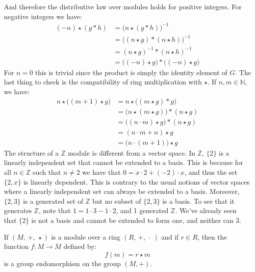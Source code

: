     And therefore the distributive law over modules holds for positive integers.
    For negative integers we have:
    \begin{subequations}
        \begin{align}
            (\minus{n})\star(g*h)
            &=\big(n\star(g*h)\big)^{\minus{1}}\\
            &=\big((n\star{g})*(n\star{h})\big)^{\minus{1}}\\
            &=(n\star{g})^{\minus{1}}*(n\star{h})^{\minus{1}}\\
            &=\big((\minus{n})\star{g}\big)*\big((\minus{n})\star{g}\big)
        \end{align}
    \end{subequations}
    For $n=0$ this is trivial since the product is simply the identity element
    of $G$. The last thing to check is the compatibility of ring multiplication
    with $\star$. If $n,m\in\mathbb{N}$, we have:
    \begin{subequations}
        \begin{align}
            n\star\big((m+1)\star{g}\big)
            &=n\star\big((m\star{g})*g\big)\\
            &=\big(n\star(m\star{g})\big)*(n\star{g})\\
            &=\big((n\cdot{m})\star{g}\big)*(n\star{g})\\
            &=(n\cdot{m}+n)\star{g}\\
            &=\big(n\cdot(m+1)\big)\star{g}
        \end{align}
    \end{subequations}
    The structure of a $\mathbb{Z}$ module is different from a vector space.
    In $\mathbb{Z}$, $\{2\}$ is a linearly independent set that cannot be
    extended to a basis. This is because for all $n\in\mathbb{Z}$ such that
    $n\ne{2}$ we have that $0=x\cdot{2}+(\minus{2})\cdot{x}$, and thus the set
    $\{2,x\}$ is linearly dependent. This is contrary to the usual notions of
    vector spaces where a linearly independent set can always be extended to a
    basis. Moreover, $\{2,3\}$ is a generated set of $\mathbb{Z}$ but no subset
    of $\{2,3\}$ is a basis. To see that it generates $\mathbb{Z}$, note that
    $1=1\cdot{3}-1\cdot{2}$, and 1 generated $\mathbb{Z}$. We've already seen
    that $\{2\}$ is not a basis and cannot be extended to form one, and neither
    can 3.
    \begin{theorem}
        \label{thm:Scalar_Mult_in_Module_Defines_Group_Endo}%
        If $(M,\,\boldsymbol{+},\,\star)$ is a module over a ring
        $(R,\,+,\,\cdot\,)$ and if $r\in{R}$, then the function
        $f:M\rightarrow{M}$ defined by:
        \begin{equation}
            f(m)=r\star{m}
        \end{equation}
        is a group endomorphism on the group $(M,\boldsymbol{+})$.
    \end{theorem}
